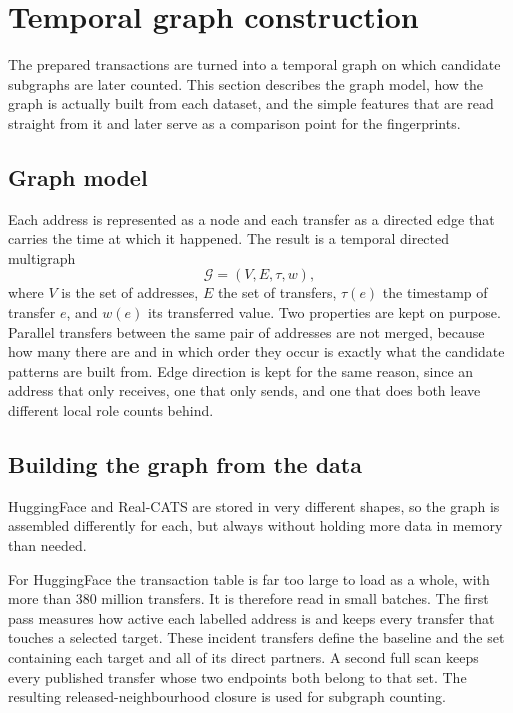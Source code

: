 \section{Temporal graph construction}
\label{sec:graph_construction}

The prepared transactions are turned into a temporal graph on which candidate
subgraphs are later counted. This section describes the graph model, how the
graph is actually built from each dataset, and the simple features that are read
straight from it and later serve as a comparison point for the fingerprints.

\subsection{Graph model}

Each address is represented as a node and each transfer as a directed edge that
carries the time at which it happened. The result is a temporal directed
multigraph
\[
  \mathcal{G}=(V,E,\tau,w),
\]
where $V$ is the set of addresses, $E$ the set of transfers, $\tau(e)$ the
timestamp of transfer $e$, and $w(e)$ its transferred value. Two properties are
kept on purpose. Parallel transfers between the same pair of addresses are not
merged, because how many there are and in which order they occur is exactly what
the candidate patterns are built from. Edge direction is kept for the same reason, since an
address that only receives, one that only sends, and one that does both leave
different local role counts behind.

\subsection{Building the graph from the data}

HuggingFace and Real-CATS are stored in very different shapes, so the graph is
assembled differently for each, but always without holding more data in memory
than needed.

For HuggingFace the transaction table is far too large to load as a whole, with
more than 380 million transfers. It is therefore read in small batches. The
first pass measures how active each labelled address is and keeps every transfer
that touches a selected target. These incident transfers define the baseline and
the set containing each target and all of its direct partners. A second full
scan keeps every published transfer whose two endpoints both belong to that set.
The resulting released-neighbourhood closure is used for subgraph counting.

